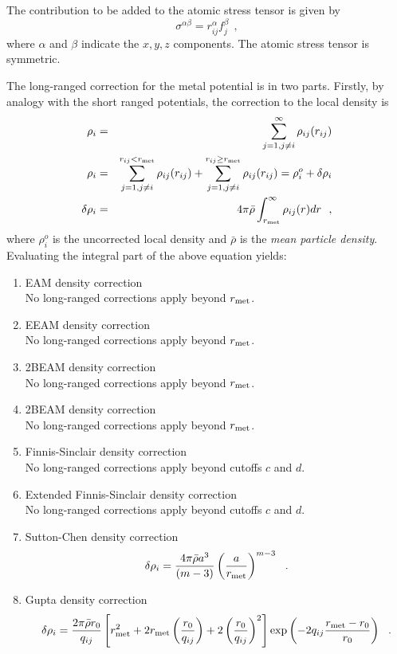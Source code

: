 The contribution to be added to the atomic stress tensor is
given by
\begin{equation}
\sigma^{\alpha \beta} = r_{ij}^{\alpha} f_{j}^{\beta}~~,
\end{equation}
where $\alpha$ and $\beta$ indicate the $x,y,z$ components.  The
atomic stress tensor is symmetric.

The long-ranged correction
for the \D metal potential is in two parts.  Firstly, by analogy
with the short ranged potentials, the correction to the
local density is
\begin{eqnarray}
\rho_{i} &=& \sum_{j=1, j \ne i}^{\infty} \rho_{ij}(r_{ij}) \nonumber \\
\rho_{i} &=& \sum_{j=1, j \ne i}^{r_{ij}<r_{\rm met}} \rho_{ij}(r_{ij}) +
\sum_{j=1, j \ne i}^{r_{ij} \ge r_{\rm met}} \rho_{ij}(r_{ij}) =
\rho_{i}^{o} + \delta \rho_{i} \\
\delta \rho_{i} &=& 4 \pi \bar{\rho} \int_{r_{\rm met}}^{\infty} \rho_{ij}(r) dr~~, \nonumber
\end{eqnarray}
where $\rho_{i}^{o}$ is the uncorrected local density and
$\bar{\rho}$ is the {\em mean particle density}.  Evaluating the
integral part of the above equation yields:
\begin{enumerate}
\item EAM density correction \\
No long-ranged corrections apply beyond $r_{\rm met}$.
\item EEAM density correction \\
No long-ranged corrections apply beyond $r_{\rm met}$.
\item 2BEAM density correction \\
No long-ranged corrections apply beyond $r_{\rm met}$.
\item 2BEAM density correction \\
No long-ranged corrections apply beyond $r_{\rm met}$.
\item Finnis-Sinclair density correction \\
No long-ranged corrections apply beyond cutoffs $c$ and $d$.
\item Extended Finnis-Sinclair density correction \\
No long-ranged corrections apply beyond cutoffs $c$ and $d$.
\item Sutton-Chen density correction
\begin{eqnarray}
\delta \rho_{i} = \frac{4 \pi \bar{\rho} a^{3}}{(m-3)}
\left( \frac{a}{r_{\rm met}} \right)^{m-3}~~.
\end{eqnarray}
\item Gupta density correction
\begin{eqnarray}
\delta \rho_{i} = \frac{2 \pi \bar{\rho} r_{0}}{q_{ij}}
\left[ r_{\rm met}^{2} + 2 r_{\rm met} \left(\frac{r_{0}}{q_{ij}}\right) +
2 \left(\frac{r_{0}}{q_{ij}}\right)^{2} \right]
\exp \left( -2 q_{ij} \frac{r_{\rm met}-r_{0}}{r_{0}}\right)~~.
\end{eqnarray}
\end{enumerate}
